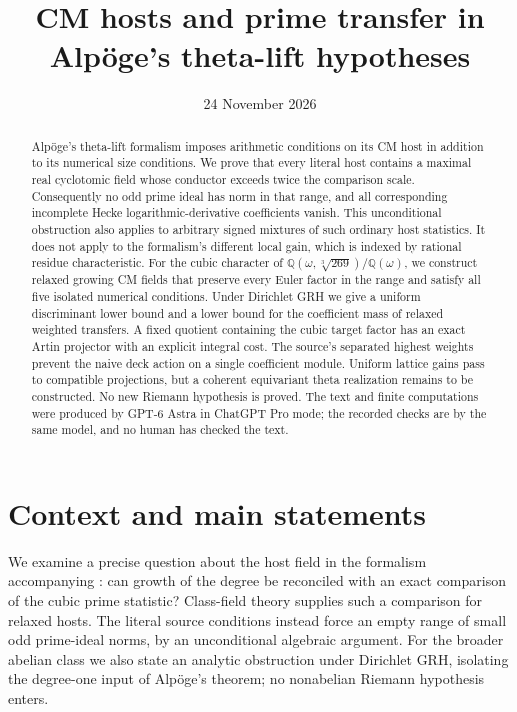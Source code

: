 \documentclass[11pt]{article}
\title{CM hosts and prime transfer in Alp\"oge's theta-lift hypotheses}
\author{}
\date{24 November 2026}
\theoremstyle{remark}\newtheorem{remark}[theorem]{Remark}
\newcommand{\Q}{\mathbb Q}
\begin{document}
\maketitle

\begin{abstract}
Alp\"oge's theta-lift formalism imposes arithmetic conditions on its CM
host in addition to its numerical size conditions. We prove that every
literal host contains a maximal real cyclotomic field whose
conductor exceeds twice the comparison scale. Consequently no odd
prime ideal has norm in that range, and all corresponding incomplete
Hecke logarithmic-derivative coefficients vanish. This unconditional
obstruction also applies to arbitrary signed mixtures of such ordinary
host statistics. It does not apply to the formalism's different local
gain, which is indexed by rational residue characteristic.
For the cubic character of $\Q(\omega,\sqrt[3]{269})/\Q(\omega)$,
we construct relaxed growing CM fields that preserve every Euler
factor in the range and satisfy all five isolated numerical conditions.
Under Dirichlet GRH we give a uniform discriminant lower bound and a
lower bound for the coefficient mass of relaxed weighted transfers.
A fixed quotient containing the cubic target factor has an exact
Artin projector with an explicit integral cost. The source's separated
highest weights prevent the naive deck action on a single coefficient
module. Uniform lattice gains pass to compatible projections, but a
coherent equivariant theta realization remains to be constructed.
No new Riemann hypothesis is proved.
The text and finite computations were produced by GPT-6 Astra in
ChatGPT Pro mode; the recorded checks are by the same model, and no
human has checked the text.
\end{abstract}

\section{Context and main statements}

We examine a precise question about the host field in the formalism
accompanying \citet{Alpoge2026}: can growth of the degree be reconciled
with an exact comparison of the cubic prime statistic?
Class-field theory supplies such a comparison for relaxed hosts.
The literal source conditions instead force an empty range of small
odd prime-ideal norms, by an unconditional algebraic argument.
For the broader abelian class we also state an analytic obstruction
under Dirichlet GRH, isolating the degree-one input of Alp\"oge's
theorem; no nonabelian Riemann hypothesis enters.
\end{document}
